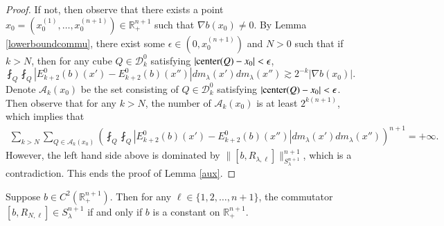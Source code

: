 \documentclass[12pt]{amsart}
\begin{document}
\begin{proof}
If not, then observe that there exists a point $x_0=(x_0^{(1)},\ldots,x_0^{(n+1)})\in \mathbb{R}_{+}^{n+1}$ such that $\nabla b(x_0) \neq 0$. By Lemma \ref{lowerboundcommu}, there exist some $\epsilon\in (0,x_0^{(n+1)})$ and $N>0$ such that if $k>N$, then for any cube $Q\in \mathcal{D}_{k}^0$ satisfying $|{\rm center}(Q)-x_0|<\epsilon$,
\begin{equation*}
\fint_{Q}\fint_{Q}|E_{k+2}^0(b)(x') - E_{k+2}^0(b)(x'')|dm_\lambda(x')dm_\lambda(x'') \gtrsim 2^{-k}|\nabla b(x_0)|.
\end{equation*}
Denote $\mathcal{A}_k(x_0)$ be the set consisting of $Q\in \mathcal{D}_{k}^0$ satisfying $|{\rm center}(Q)-x_0|<\epsilon$. Then observe that for any $k>N$, the number of $\mathcal{A}_k(x_0)$ is at least $2^{k(n+1)}$, which implies that
\begin{align*}
\sum_{k>N}\sum_{Q\in \mathcal{A}_k (x_0)}\left(\fint_{Q}\fint_{Q}|E_{k+2}^0(b)(x') - E_{k+2}^0(b)(x'')|dm_\lambda(x')dm_\lambda(x'') \right)^{n+1}=+\infty.
\end{align*}
However, the left hand side above is dominated by
$\|[b,R_{\lambda,\ell}]\|_{S_\lambda^{n+1}}^{n+1}$, which is a contradiction.
This ends the proof of Lemma \ref{aux}.
\end{proof}
\begin{proposition}\label{kkkey}
Suppose {\color{red}$b \in C^2(\mathbb{R}_+^{n+1})$}. Then for any $\ell\in \{1,2,\ldots,n+1\}$, the commutator $[b,R_{N,\ell}]\in S_\lambda^{n+1}$ if and only if $b$ is a constant on $\mathbb{R}^{n+1}_+$.
\end{proposition}
\end{document}
